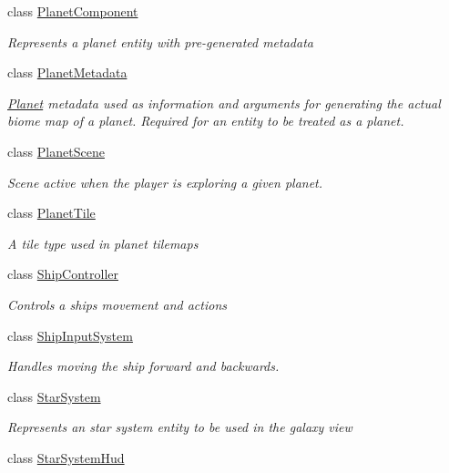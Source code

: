 \begin{DoxyCompactItemize}
class \hyperlink{class_midnight_blue_1_1_planet_component}{Planet\+Component}
\begin{DoxyCompactList}\small\item\em Represents a planet entity with pre-\/generated metadata \end{DoxyCompactList}\item 
class \hyperlink{class_midnight_blue_1_1_planet_metadata}{Planet\+Metadata}
\begin{DoxyCompactList}\small\item\em \hyperlink{class_midnight_blue_1_1_planet}{Planet} metadata used as information and arguments for generating the actual biome map of a planet. Required for an entity to be treated as a planet. \end{DoxyCompactList}\item 
class \hyperlink{class_midnight_blue_1_1_planet_scene}{Planet\+Scene}
\begin{DoxyCompactList}\small\item\em Scene active when the player is exploring a given planet. \end{DoxyCompactList}\item 
class \hyperlink{class_midnight_blue_1_1_planet_tile}{Planet\+Tile}
\begin{DoxyCompactList}\small\item\em A tile type used in planet tilemaps \end{DoxyCompactList}\item 
class \hyperlink{class_midnight_blue_1_1_ship_controller}{Ship\+Controller}
\begin{DoxyCompactList}\small\item\em Controls a ships movement and actions \end{DoxyCompactList}\item 
class \hyperlink{class_midnight_blue_1_1_ship_input_system}{Ship\+Input\+System}
\begin{DoxyCompactList}\small\item\em Handles moving the ship forward and backwards. \end{DoxyCompactList}\item 
class \hyperlink{class_midnight_blue_1_1_star_system}{Star\+System}
\begin{DoxyCompactList}\small\item\em Represents an star system entity to be used in the galaxy view \end{DoxyCompactList}\item 
class \hyperlink{class_midnight_blue_1_1_star_system_hud}{Star\+System\+Hud}

\end{DoxyCompactItemize}
